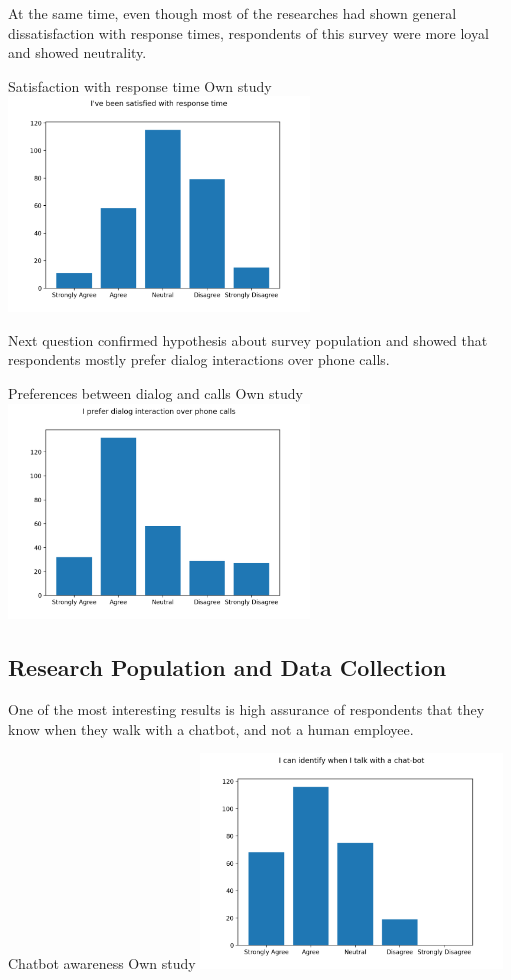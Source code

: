 At the same time, even though most of the researches had shown general dissatisfaction with response times, respondents of this survey were more loyal and showed neutrality.

\mtfigure
{Satisfaction with response time}
{Own study}
{
    \includegraphics[width=0.6\textwidth,height=\textheight,keepaspectratio]{survey/5_i've_been_satisfied_with_response_time.png}
}

Next question confirmed hypothesis about survey population and showed that respondents mostly prefer dialog interactions over phone calls.

\mtfigure
{Preferences between dialog and calls}
{Own study}
{
    \includegraphics[width=0.6\textwidth,height=\textheight,keepaspectratio]{survey/6_i_prefer_dialog_interaction_over_phone_calls.png}
}


\subsection{Research Population and Data Collection}

One of the most interesting results is high assurance of respondents that they know when they walk with a chatbot, and not a human employee.

\mtfigure
{Chatbot awareness}
{Own study}
{
    \includegraphics[width=0.6\textwidth,height=\textheight,keepaspectratio]{survey/7_i_can_identify_when_i_talk_with_a_chat-bot.png}
}

